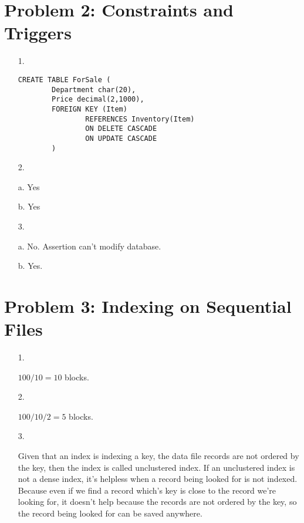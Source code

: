 \documentclass[letter,11pt]{article}
\begin{document}
\section*{Problem 2: Constraints and Triggers}

\begin{enumerate}
  \item[1.]

\begin{verbatim}
CREATE TABLE ForSale (
        Department char(20),
        Price decimal(2,1000),
        FOREIGN KEY (Item)
                REFERENCES Inventory(Item)
                ON DELETE CASCADE
                ON UPDATE CASCADE
        )

\end{verbatim}
    
  \item[2.]

    a. Yes

    b. Yes

  \item[3.]

    a. No. Assertion can't modify database.

    b. Yes. 


\end{enumerate}

\section*{Problem 3: Indexing on Sequential Files}

\begin{enumerate}
\item[1.]

$100/10 = 10$ blocks.

\item[2.]

$100/10/2 = 5$ blocks.

\item[3.]

Given that an index is indexing a key, the data file records are not ordered by the key, then the index is called unclustered index. If an unclustered index is not a dense index, it's helpless when a record being looked for is not indexed. Because even if we find a record which's key is close to the record we're looking for, it doesn't help because the records are not ordered by the key, so the record being looked for can be saved anywhere. 

\end{enumerate}
\end{document}
